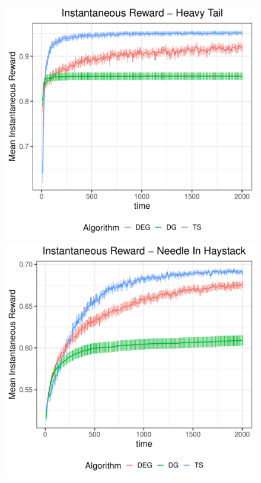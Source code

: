 \documentclass[../competing_bandits_with_appendix.tex]{subfiles}
\begin{document}
\begin{figure}[h]
\begin{center}
\includegraphics[scale=0.25]{ec19paper/appendix_figures/mean_inst_reward_ht}
\includegraphics[scale=0.25]{ec19paper/appendix_figures/mean_inst_reward_nih}

\end{center}
\end{figure}
\end{document}
